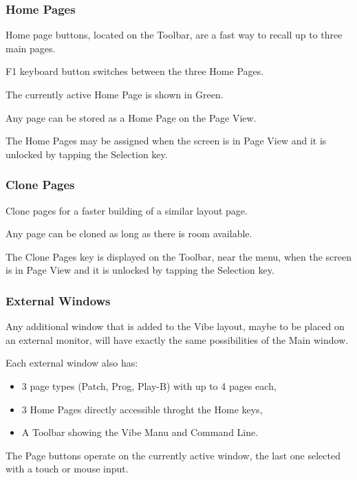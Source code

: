 \documentclass[
]{article}
\begin{document}
\hypertarget{home-pages}{%
\subsubsection{Home Pages}\label{home-pages}}

Home page buttons, located on the Toolbar, are a fast way to recall up to three main pages.

F1 keyboard button switches between the three Home Pages.

The currently active Home Page is shown in Green.

Any page can be stored as a Home Page on the Page View.

The Home Pages may be assigned when the screen is in Page View and it is unlocked by tapping the Selection key.

\hypertarget{clone-pages}{%
\subsubsection{Clone Pages}\label{clone-pages}}

Clone pages for a faster building of a similar layout page.

Any page can be cloned as long as there is room available.

The Clone Pages key is displayed on the Toolbar, near the menu, when the screen is in Page View and it is unlocked by tapping the Selection key.

\hypertarget{external-windows}{%
\subsubsection{External Windows}\label{external-windows}}

Any additional window that is added to the Vibe layout, maybe to be placed on an external monitor, will have exactly the same possibilities of the Main window.

Each external window also has:

\begin{itemize}
\item
  3 page types (Patch, Prog, Play-B) with up to 4 pages each,
\item
  3 Home Pages directly accessible throght the Home keys,
\item
  A Toolbar showing the Vibe Manu and Command Line.
\end{itemize}

The Page buttons operate on the currently active window, the last one selected with a touch or mouse input.
\end{document}
